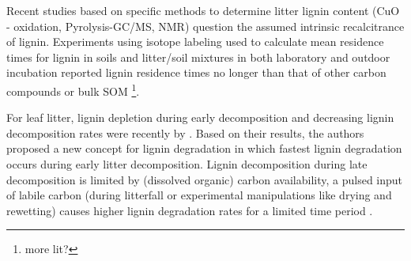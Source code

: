 \documentclass[authoryear,preprint,review,12pt]{elsarticle}
\begin{document}
                                                                                                                                                                                                                                                                                                                                                                                                                                                                                                                                                                                                                                                                                                                                                                                                                                                                                                                                                                                                                                                                                                                              Recent studies based on specific methods to determine litter lignin content (CuO - oxidation, Pyrolysis-GC/MS, NMR) question the assumed intrinsic recalcitrance of lignin. Experiments using isotope labeling used to calculate mean residence times for lignin in soils and litter/soil mixtures in both laboratory and outdoor incubation reported lignin residence times no longer than that of other carbon compounds or bulk SOM \citep{Thevenot2010a, Bol2009}\footnote{more lit?}.

                                                                                                                                                                                                                                                                                                                                                                                                                                                                                                                                                                                                                                                                                                                                                                                                                                                                                                                                                                                                                                                                                                                              For leaf litter, lignin depletion during early decomposition and decreasing lignin decomposition rates were recently by \cite{Klotzbucher2011}. Based on their results, the authors proposed a new concept for lignin degradation in which fastest lignin degradation occurs during early litter decomposition. Lignin decomposition during late decomposition is limited by (dissolved organic) carbon availability, a pulsed input of labile carbon (during litterfall or experimental manipulations like drying and rewetting) causes higher lignin degradation rates for a limited time period .
\end{document}
